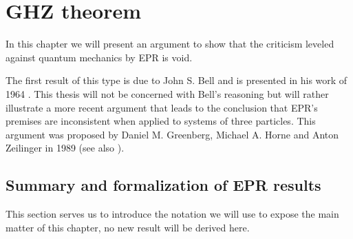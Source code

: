 \chapter{GHZ theorem}
\label{chap:ghz-theorem}
In this chapter we will present an argument to show that the criticism leveled against quantum mechanics by EPR is void.

The first result of this type is due to John S. Bell and is presented in his work of 1964 \cite{Bell1964}. This thesis will not be concerned with Bell's reasoning but will rather illustrate a more recent argument that leads to the conclusion that EPR's premises are inconsistent when applied to systems of three particles. This argument was proposed by Daniel M. Greenberg, Michael A. Horne and Anton Zeilinger in 1989 \cite{ghz1989} (see also \cite{:/content/aapt/journal/ajp/58/12/10.1119/1.16243}).


\section{Summary and formalization of EPR results}
This section serves us to introduce the notation we will use to expose the main matter of this chapter, no new result will be derived here.

